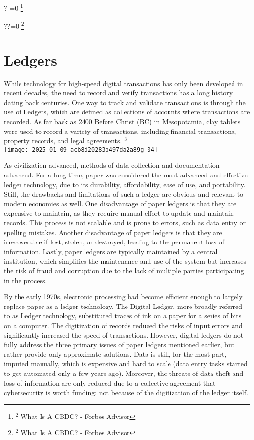 \documentclass[10pt]{article}
\let\svthefootnote\thefootnote
\newcommand\blfootnotetext[1]{%
  \let\thefootnote\relax\footnote{#1}%
  \addtocounter{footnote}{-1}%
  \let\thefootnote\svthefootnote%
}
\let\svfootnotetext\footnotetext
\renewcommand\footnotetext[2][?]{%
  \if\relax#1\relax%
    \ifnum\value{footnote}=0\blfootnotetext{#2}\else\svfootnotetext{#2}\fi%
  \else%
    \if?#1\ifnum\value{footnote}=0\blfootnotetext{#2}\else\svfootnotetext{#2}\fi%
    \else\svfootnotetext[#1]{#2}\fi%
  \fi
}
\begin{document}
\section*{Ledgers}
While technology for high-speed digital transactions has only been developed in recent decades, the need to record and verify transactions has a long history dating back centuries. One way to track and validate transactions is through the use of Ledgers, which are defined as collections of accounts where transactions are recorded. As far back as 2400 Before Christ (BC) in Mesopotamia, clay tablets were used to record a variety of transactions, including financial transactions, property records, and legal agreements. ${ }^{3}$\\
\texttt{[image: 2025\_01\_09\_acb8d20283b497da2a89g-04]}

As civilization advanced, methods of data collection and documentation advanced. For a long time, paper was considered the most advanced and effective ledger technology, due to its durability, affordability, ease of use, and portability. Still, the drawbacks and limitations of such a ledger are obvious and relevant to modern economies as well. One disadvantage of paper ledgers is that they are expensive to maintain, as they require manual effort to update and maintain records. This process is not scalable and is prone to errors, such as data entry or spelling mistakes. Another disadvantage of paper ledgers is that they are irrecoverable if lost, stolen, or destroyed, leading to the permanent loss of information. Lastly, paper ledgers are typically maintained by a central institution, which simplifies the maintenance and use of the system but increases the risk of fraud and corruption due to the lack of multiple parties participating in the process.

By the early 1970s, electronic processing had become efficient enough to largely replace paper as a ledger technology. The Digital Ledger, more broadly referred to as Ledger technology, substituted traces of ink on a paper for a series of bits on a computer. The digitization of records reduced the risks of input errors and significantly increased the speed of transactions. However, digital ledgers do not fully address the three primary issues of paper ledgers mentioned earlier, but rather provide only approximate solutions. Data is still, for the most part, imputed manually, which is expensive and hard to scale (data entry tasks started to get automated only a few years ago). Moreover, the threats of data theft and loss of information are only reduced due to a collective agreement that cybersecurity is worth funding; not because of the digitization of the ledger itself.
\end{document}
